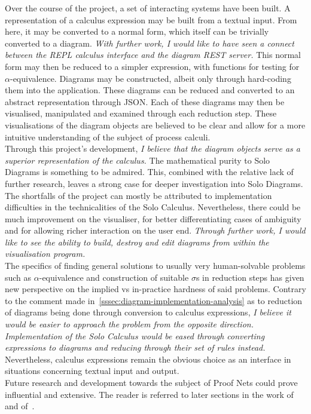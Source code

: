 Over the course of the project, a set of interacting systems have been built.
A representation of a calculus expression may be built from a textual input.
From here, it may be converted to a normal form, which itself can be trivially converted to a diagram.
\textit{With further work, I would like to have seen a connect between the REPL calculus interface and the diagram REST server.}
This normal form may then be reduced to a simpler expression, with functions for testing for $\alpha$-equivalence.
Diagrams may be constructed, albeit only through hard-coding them into the application.
These diagrams can be reduced and converted to an abstract representation through JSON.
Each of these diagrams may then be visualised, manipulated and examined through each reduction step.
These visualisations of the diagram objects are believed to be clear and allow for a more intuitive understanding of the subject of process calculi.\\

Through this project's development, \textit{I believe that the diagram objects serve as a superior representation of the calculus.}
The mathematical purity to Solo Diagrams is something to be admired.
This, combined with the relative lack of further research, leaves a strong case for deeper investigation into Solo Diagrams.\\

The shortfalls of the project can mostly be attributed to implementation difficulties in the technicalities of the Solo Calculus.
Nevertheless, there could be much improvement on the visualiser, for better differentiating cases of ambiguity and for allowing richer interaction on the user end.
\textit{Through further work, I would like to see the ability to build, destroy and edit diagrams from within the visualisation program.}\\

The specifics of finding general solutions to usually very human-solvable problems such as $\alpha$-equivalence and construction of suitable $\sigma$s in reduction steps has given new perspective on the implied vs in-practice hardness of said problems.
Contrary to the comment made in~\ref{sssec:diagram-implementation-analysis} as to reduction of diagrams being done through conversion to calculus expressions, \textit{I believe it would be easier to approach the problem from the opposite direction.}
\textit{Implementation of the Solo Calculus would be eased through converting expressions to diagrams and reducing through their set of rules instead.}
Nevertheless, calculus expressions remain the obvious choice as an interface in situations concerning textual input and output.\\

Future research and development towards the subject of Proof Nets could prove influential and extensive.
The reader is referred to later sections in the work of~\cite{solo-diagrams} and of~\cite{acyclic-solos}.
